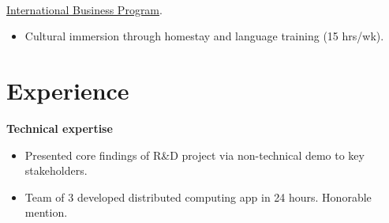 \documentclass[margin]{res}
\begin{document}
\begin{sloppypar}
\begin{resume}
\\
\href{http://www.disabroad.org/study-abroad/programs/business/}{International Business Program}.
\begin{itemize}
    \item Cultural immersion through homestay and language training (15 hrs/wk). 
\end{itemize}

\section{Experience}
\textbf{Technical expertise} \\
    \begin{itemize}
        \item Presented core findings of R\&D project via non-technical demo to key stakeholders.
    \end{itemize}

        \begin{itemize}
            \item Team of 3 developed distributed computing app in 24 hours. Honorable mention.
        \end{itemize}


\end{resume}
\end{sloppypar}
\end{document}

